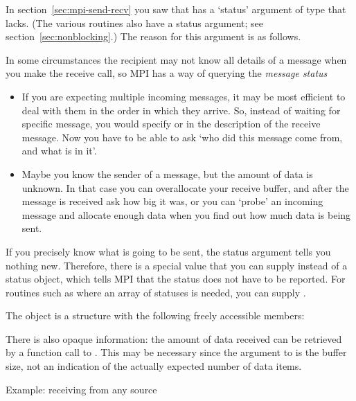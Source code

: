 In section~\ref{sec:mpi-send-recv}
you saw that  has a `status' argument
of type  that  lacks.
(The various   routines also have a status
argument; see section~\ref{sec:nonblocking}.) The reason for this
argument is
as follows.

In some circumstances the recipient may not know all details of a
message when you make the receive call, so MPI has a way of querying
the \emph{message status}
\begin{itemize}
\item If you are expecting multiple incoming messages, it may be most
  efficient to deal with them in the order in which they arrive. So,
  instead of waiting for specific message, you would specify
   or  in
  the description of the receive message. 
  Now you have to be able to ask `who did this message come from,
  and what is in it'.
\item Maybe you know the sender of a message, but the amount of data
  is unknown. In that case you can overallocate your receive buffer,
  and after the message is received ask how big it was, or you can
  `probe' an incoming message and allocate enough data when you find
  out how much data is being sent.
\end{itemize}


If you 
precisely know what is going to be sent, the status argument tells you 
nothing new. Therefore, there is a special value 
that you can supply instead of a status object, which tells MPI that the 
status does not have to be reported. For routines such as 
where an array of statuses is needed, you can supply .

The  object
is a structure with the following
freely accessible members:
%
%
%

There is also
opaque information: the amount of data received can be retrieved by a
function call to .
%
%
This may be necessary since the  argument to  is 
the buffer size, not an indication of the actually expected number of
data items.

 {Example: receiving from any source}

